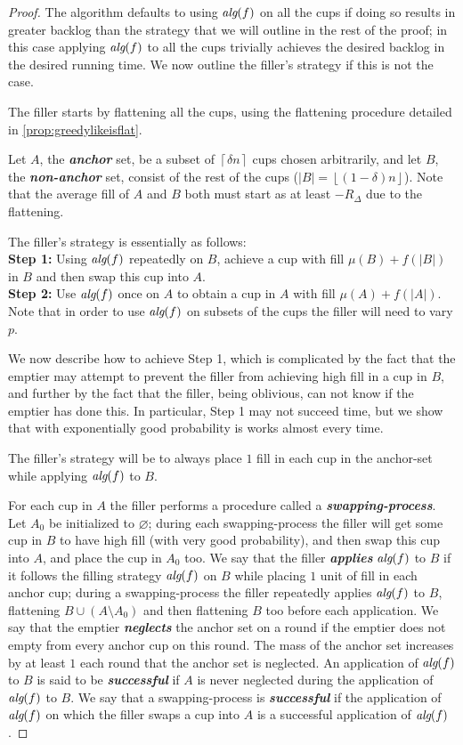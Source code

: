 \documentclass[twocolumn]{article}[10pt]
\newcommand{\defn}[1]{{\textit{\textbf{\boldmath #1}}}\xspace}
\newcommand{\alg}[1]{\textit{\text{alg}}({#1})}
\newcommand{\floor}[1]{\left\lfloor #1 \right\rfloor}
\newcommand{\ceil}[1]{\left\lceil #1 \right\rceil}
\begin{document}
\begin{proof}
The algorithm defaults to using $\alg{f}$ on all the cups if doing
so results in greater backlog than the strategy that we will
outline in the rest of the proof; in this case applying $\alg{f}$
to all the cups trivially achieves the desired backlog in the
desired running time. We now outline the filler's strategy if this is not the case.

  The filler starts by flattening all the cups, using the flattening procedure
  detailed in \cref{prop:greedylikeisflat}. 

  Let $A$, the \defn{anchor} set, be a subset of $\ceil{\delta n}$ cups
  chosen arbitrarily, and let $B$, the \defn{non-anchor} set,
  consist of the rest of the cups ($|B| = \floor{(1-\delta)n}$). Note
  that the average fill of $A$ and $B$ both must start as at
  least $-R_\Delta$ due to the flattening. 

  The filler's strategy is essentially as follows:\\
  \textbf{Step 1:} Using $\alg{f}$ repeatedly on $B$, achieve a
  cup with fill $\mu(B) + f(|B|)$ in $B$ and then swap this cup into $A$. \\
  \textbf{Step 2:} Use $\alg{f}$ once on $A$ to obtain a cup in
  $A$ with fill $\mu(A) + f(|A|)$.\\
  Note that in order to use $\alg{f}$ on subsets of the cups the filler will need to vary $p$.

  We now describe how to achieve Step 1, which is complicated by
  the fact that the emptier may attempt to prevent the filler
  from achieving high fill in a cup in $B$, and further by the
  fact that the filler, being oblivious, can not know if the
  emptier has done this. In particular, Step 1 may not succeed
  time, but we show that with exponentially good probability is
  works almost every time.

  The filler's strategy will be to always place $1$ fill in each cup in the
  anchor-set while applying $\alg{f}$ to $B$.

  For each cup in $A$ the filler performs a procedure called a
  \defn{swapping-process}. Let $A_0$ be initialized to
  $\varnothing$; during each swapping-process the filler will get
  some cup in $B$ to have high fill (with very good probability),
  and then swap this cup into $A$, and place the cup in $A_0$ too.
  We say that the filler \defn{applies}
  $\alg{f}$ to $B$ if it follows the filling strategy $\alg{f}$ on
  $B$ while placing $1$ unit of fill in each anchor cup; during a
  swapping-process the filler repeatedly applies $\alg{f}$ to $B$,
  flattening $B \cup (A\setminus A_0)$ and then flattening $B$
  too before each application.
  We say that the emptier \defn{neglects} the anchor set on a
  round if the emptier does not empty from every anchor cup on
  this round. The mass of the anchor set increases by at least
  $1$ each round that the anchor set is neglected. An application
  of $\alg{f}$ to $B$ is said to be \defn{successful} if $A$ is
  never neglected during the application of $\alg{f}$ to $B$. We
  say that a swapping-process is \defn{successful} if the application of
  $\alg{f}$ on which the filler swaps a cup into $A$ is a
  successful application of $\alg{f}$.


\end{proof}
\end{document}
